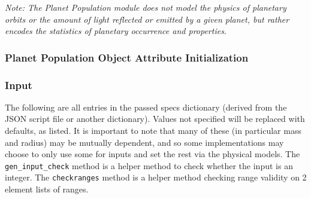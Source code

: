 \documentclass[cleanfoot]{asme2ej}
\begin{document}
\bigskip

\noindent\emph{Note: The Planet Population module does not model the physics of planetary orbits or the amount of light reflected or emitted by a given planet, but rather encodes the statistics of planetary occurrence and properties. }

\label{sec:planetpopulation}
\subsubsection{Planet Population Object Attribute Initialization} 
\subsubsection*{Input}
The following are all entries in the passed specs dictionary (derived from the JSON script file or another dictionary).  Values not specified will be replaced with defaults, as listed.  It is important to note that many of these (in particular mass and radius) may be mutually dependent, and so some implementations may choose to only use some for inputs and set the rest via the physical models. The \verb+gen_input_check+ method is a helper method to check whether the input is an integer. The \verb+checkranges+ method is a helper method checking range validity on 2 element lists of ranges.
\end{document}
